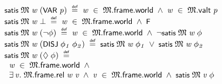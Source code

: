 \documentclass{report}
\renewcommand{\HOLConst}[1]{{\textsf{\upshape\small #1}}}
\newenvironment{holmath}{\begin{displaymath}\begin{array}{l}}{\end{array}\end{displaymath}\ignorespacesafterend}
\begin{document}
\begin{holmath}
  \HOLConst{satis}\;\HOLFreeVar{\ensuremath{\mathfrak{M}}}\;\HOLFreeVar{w}\;(\HOLConst{VAR}\;\HOLFreeVar{p})\;\HOLSymConst{\HOLTokenDefEquality{}}\;\HOLFreeVar{w}\;\HOLSymConst{\HOLTokenIn{}}\;\HOLFreeVar{\ensuremath{\mathfrak{M}}}.\HOLFieldName{frame}.\HOLFieldName{world}\;\HOLSymConst{\HOLTokenConj{}}\;\HOLFreeVar{w}\;\HOLSymConst{\HOLTokenIn{}}\;\HOLFreeVar{\ensuremath{\mathfrak{M}}}.\HOLFieldName{valt}\;\HOLFreeVar{p}\\
\HOLConst{satis}\;\HOLFreeVar{\ensuremath{\mathfrak{M}}}\;\HOLFreeVar{w}\;\HOLSymConst{\ensuremath{\bot}}\;\HOLSymConst{\HOLTokenDefEquality{}}\;\HOLFreeVar{w}\;\HOLSymConst{\HOLTokenIn{}}\;\HOLFreeVar{\ensuremath{\mathfrak{M}}}.\HOLFieldName{frame}.\HOLFieldName{world}\;\HOLSymConst{\HOLTokenConj{}}\;\HOLConst{F}\\
\HOLConst{satis}\;\HOLFreeVar{\ensuremath{\mathfrak{M}}}\;\HOLFreeVar{w}\;(\HOLSymConst{\HOLTokenNeg{}}\HOLFreeVar{\ensuremath{\phi}})\;\HOLSymConst{\HOLTokenDefEquality{}}\;\HOLFreeVar{w}\;\HOLSymConst{\HOLTokenIn{}}\;\HOLFreeVar{\ensuremath{\mathfrak{M}}}.\HOLFieldName{frame}.\HOLFieldName{world}\;\HOLSymConst{\HOLTokenConj{}}\;\HOLSymConst{\HOLTokenNeg{}}\HOLConst{satis}\;\HOLFreeVar{\ensuremath{\mathfrak{M}}}\;\HOLFreeVar{w}\;\HOLFreeVar{\ensuremath{\phi}}\\
\HOLConst{satis}\;\HOLFreeVar{\ensuremath{\mathfrak{M}}}\;\HOLFreeVar{w}\;(\HOLConst{DISJ}\;\HOLFreeVar{\ensuremath{\phi\sb{1}}}\;\HOLFreeVar{\ensuremath{\phi\sb{2}}})\;\HOLSymConst{\HOLTokenDefEquality{}}\;\HOLConst{satis}\;\HOLFreeVar{\ensuremath{\mathfrak{M}}}\;\HOLFreeVar{w}\;\HOLFreeVar{\ensuremath{\phi\sb{1}}}\;\HOLSymConst{\HOLTokenDisj{}}\;\HOLConst{satis}\;\HOLFreeVar{\ensuremath{\mathfrak{M}}}\;\HOLFreeVar{w}\;\HOLFreeVar{\ensuremath{\phi\sb{2}}}\\
\HOLConst{satis}\;\HOLFreeVar{\ensuremath{\mathfrak{M}}}\;\HOLFreeVar{w}\;(\HOLSymConst{\ensuremath{\Diamond}}\;\HOLFreeVar{\ensuremath{\phi}})\;\HOLSymConst{\HOLTokenDefEquality{}}\\
\;\;\HOLFreeVar{w}\;\HOLSymConst{\HOLTokenIn{}}\;\HOLFreeVar{\ensuremath{\mathfrak{M}}}.\HOLFieldName{frame}.\HOLFieldName{world}\;\HOLSymConst{\HOLTokenConj{}}\\
\;\;\HOLSymConst{\HOLTokenExists{}}\HOLBoundVar{v}.\;\HOLFreeVar{\ensuremath{\mathfrak{M}}}.\HOLFieldName{frame}.\HOLFieldName{rel}\;\HOLFreeVar{w}\;\HOLBoundVar{v}\;\HOLSymConst{\HOLTokenConj{}}\;\HOLBoundVar{v}\;\HOLSymConst{\HOLTokenIn{}}\;\HOLFreeVar{\ensuremath{\mathfrak{M}}}.\HOLFieldName{frame}.\HOLFieldName{world}\;\HOLSymConst{\HOLTokenConj{}}\;\HOLConst{satis}\;\HOLFreeVar{\ensuremath{\mathfrak{M}}}\;\HOLBoundVar{v}\;\HOLFreeVar{\ensuremath{\phi}}
\end{holmath}
\end{document}
